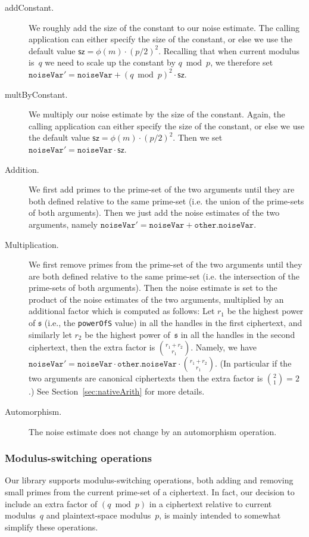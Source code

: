 \documentclass[14pt]{extarticle}
\newcommand{\secref}[1]{Section~\protect\ref{sec:#1}}
\newcommand{\sk}{\mathfrak{s}}
\begin{document}
\begin{description}
\item[addConstant.] We roughly add the size of the constant to our
noise estimate. The calling application can either specify the size
of the constant, or else we use the default value $\mathsf{sz}=\phi(m)
\cdot(p/2)^2$. Recalling that when current modulus is~$q$ we need
to scale up the constant by $q \bmod p$, we therefore set
$\mathtt{noiseVar}'=\mathtt{noiseVar}+(q\bmod p)^2\cdot\mathsf{sz}$.

\item[multByConstant.] We multiply our noise estimate by
the size of the constant. Again, the calling application can either
specify the size of the constant, or else we use the default value
$\mathsf{sz}=\phi(m)\cdot(p/2)^2$. Then we set $\mathtt{noiseVar}'=
\mathtt{noiseVar}\cdot\mathsf{sz}$.

\item[Addition.] We first add primes to the prime-set of the two
arguments until they are both defined relative to the same prime-set
(i.e. the union of the prime-sets of both arguments). Then we just add
the noise estimates of the two arguments, namely $\mathtt{noiseVar}'=
\mathtt{noiseVar} + \mathtt{other.noiseVar}$.

\item[Multiplication.] We first remove primes from the prime-set of
the two arguments until they are both defined relative to the same
prime-set (i.e. the intersection of the prime-sets of both arguments).
Then the noise estimate is set to the product of the noise estimates
of the two arguments, multiplied by an additional factor which is
computed as follows: Let $r_1$ be the highest power of $\sk$ (i.e.,
the \texttt{powerOfS} value) in all the handles in the first
ciphertext, and similarly let $r_2$ be the highest power of~$\sk$ in
all the handles in the second ciphertext, then the extra factor is 
${{r_1+r_2}\choose{r_1}}$. Namely, we have $\mathtt{noiseVar}'= 
\mathtt{noiseVar}\cdot\mathtt{other.noiseVar}\cdot{{r_1+r_2}\choose
{r_1}}$. (In particular if the two arguments are canonical ciphertexts
then the extra factor is ${2\choose1}=2$.) See \secref{nativeArith}
for more details.

\item[Automorphism.] The noise estimate does not change by an
automorphism operation.
\end{description}

\subsubsection{Modulus-switching operations}\label{sec:modSwitch}
Our library supports modulus-switching operations, both adding and
removing small primes from the current prime-set of a ciphertext.
In fact, our decision to include an extra factor of $(q \bmod p)$
in a ciphertext relative to current modulus~$q$ and plaintext-space
modulus~$p$, is mainly intended to somewhat simplify these
operations.
\end{document}
